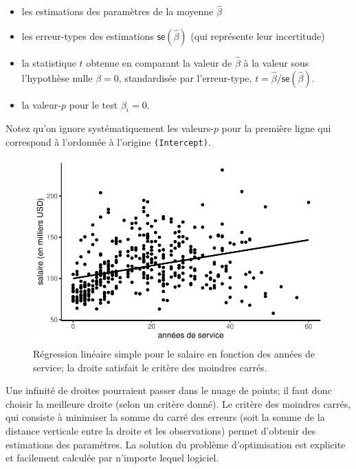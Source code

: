 \documentclass[
  11pt,
  letterpaper,
]{scrbook}
\providecommand{\tightlist}{%
  \setlength{\itemsep}{0pt}\setlength{\parskip}{0pt}}\usepackage{longtable,booktabs,array}
\theoremstyle{definition}
\theoremstyle{remark}
\begin{document}
\begin{itemize}
\tightlist
\item
  les estimations des paramètres de la moyenne \(\widehat{\beta}\)
\item
  les erreur-types des estimations \(\mathsf{se}(\widehat{\beta})\) (qui
  représente leur incertitude)
\item
  la statistique \(t\) obtenue en comparant la valeur de
  \(\widehat{\beta}\) à la valeur sous l'hypothèse nulle \(\beta=0\),
  standardisée par l'erreur-type,
  \(t=\widehat{\beta}/\mathsf{se}(\widehat{\beta})\).
\item
  la valeur-\(p\) pour le test \(\beta_i=0\).
\end{itemize}

Notez qu'on ignore systématiquement les valeurs-\(p\) pour la première
ligne qui correspond à l'ordonnée à l'origine \texttt{(Intercept)}.

\begin{figure}[ht!]

{\centering \includegraphics{rappel-regressionlineaire_files/figure-pdf/fig-droitenuage-1.pdf}

}

\caption{\label{fig-droitenuage}Régression linéaire simple pour le
salaire en fonction des années de service; la droite satisfait le
critère des moindres carrés.}

\end{figure}

Une infinité de droites pourraient passer dans le nuage de points; il
faut donc choisir la meilleure droite (selon un critère donné). Le
critère des moindres carrés, qui consiste à minimiser la somme du carré
des erreurs (soit la somme de la distance verticale entre la droite et
les observations) permet d'obtenir des estimations des paramètres. La
solution du problème d'optimisation est explicite et facilement calculée
par n'importe lequel logiciel.
\end{document}
